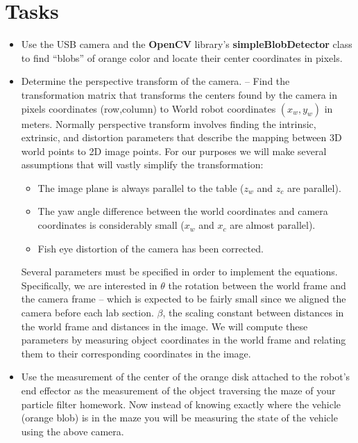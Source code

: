 \section{Tasks}
\begin{itemize}
\item Use the USB camera and the \textbf{OpenCV} library's \textbf{simpleBlobDetector} class to find “blobs” of orange color and locate their center coordinates in pixels.

\item Determine the perspective transform of the camera. -- Find the transformation matrix that transforms the centers found by the camera in pixels coordinates (row,column) to World robot coordinates $(x_w,y_w)$ in meters.  
Normally perspective transform involves finding the intrinsic, extrinsic, and distortion parameters that describe the mapping between 3D world points to 2D image points.  For our purposes we 
will make several assumptions that will vastly simplify the transformation:\\
\begin{itemize}
	\item The image plane is always parallel to the table ($z_w$ and $z_c$ are parallel).
	\item The yaw angle difference between the world coordinates and camera coordinates is considerably small ($x_w$ and $x_c$ are almost parallel).
	\item Fish eye distortion of the camera has been corrected.
\end{itemize}


\setlength{\parskip}{10pt}
Several parameters must be specified in order to implement the equations.  Specifically, we are interested in $\theta$ the rotation 
between the world frame and the camera frame -- which is expected to be fairly small since we aligned the camera before each lab section. $\beta$, the scaling constant between distances in the world frame and distances in the 
image.  We will compute these parameters by measuring object coordinates in the world frame and relating them to their corresponding 
coordinates in the image.
\setlength{\parskip}{0pt}

\item Use the measurement of the center of the orange disk attached to the robot's end effector as the measurement of the object traversing the maze of your particle filter homework.  Now instead of knowing exactly where the vehicle (orange blob) is in the maze you will be measuring the state of the vehicle using the above camera.  
\end{itemize}


